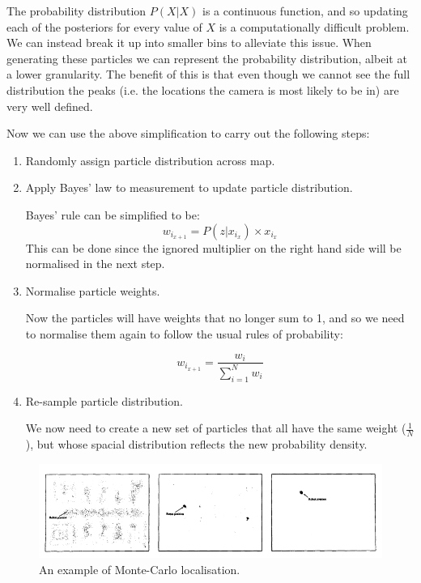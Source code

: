 The probability distribution $ P(X|X) $ is a continuous function, and so updating each of the posteriors for every value of $ X $ is a computationally difficult problem. We can instead break it up into smaller bins to alleviate this issue. When generating these particles we can represent the probability distribution, albeit at a lower granularity. The benefit of this is that even though we cannot see the full distribution the peaks (i.e. the locations the camera is most likely to be in) are very well defined.

Now we can use the above simplification to carry out the following steps:

\begin{enumerate}
      \item Randomly assign particle distribution across map.
      \item Apply Bayes' law to measurement to update particle distribution.

            Bayes' rule can be simplified to be:
            $$ w_{i_{x+1}} = P(z|x_{i_x}) \times x_{i_x} $$
            This can be done since the ignored multiplier on the right hand side will be normalised in the next step.
      \item Normalise particle weights.

            Now the particles will have weights that no longer sum to 1, and so we need to normalise them again to follow the usual rules of probability:

            $$ w_{i_{x+1}} = \frac{w_i}{\sum^N_{i=1}w_i} $$
      \item Re-sample particle distribution.

            We now need to create a new set of particles that all have the same weight ($ \frac{1}{N} $), but whose spacial distribution reflects the new probability density.
\end{enumerate}

\begin{figure}[htb]
      \centering
      \includegraphics[width=\textwidth]{background/images/monte_carlo.png}
      \caption{An example of Monte-Carlo localisation\cite{MonteCarloLocalisation}.}
      \label{fig:monte_carlo}
\end{figure}

